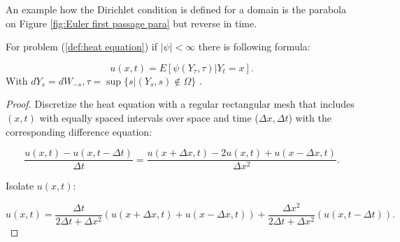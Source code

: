 \documentclass[a4paper,12pt]{article}
\begin{document}
An example how the Dirichlet condition is defined for a domain
is the parabola on Figure \ref{fig:Euler first passage para} but
reverse in time.

\begin{lemma} \label{lem:BM HE}
    For problem (\ref{def:heat equation}) if $ |\psi|< \infty$
    there is following formula:

    \begin{equation}
        u(x,t)=E[\psi(Y_{\tau},\tau) | Y_{t} =x].
    \end{equation}
    With $dY_{s} = dW_{-s},\tau = \sup\{s | (Y_{s},s) \notin \Omega\}$ .
\end{lemma}


\begin{proof}
    Discretize the heat equation
    with a regular rectangular mesh that includes $(x,t)$ with equally
    spaced intervals over space and time ($\Delta x, \Delta t$) with
    the corresponding difference equation:

    \begin{equation}
        \frac{u(x,t)-u(x,t-\Delta t)}{\Delta t} = \frac{u(x + \Delta x,t)-2 u(x,t) +u(x - \Delta x,t)}{\Delta x^{2}} .
    \end{equation}

    Isolate $u(x,t)$:

    \begin{equation} \label{eq:discrete iso heat equation}
        u(x,t) =
        \frac{\Delta t}{ 2 \Delta t + \Delta x^{2}}
        \left(
        u(x+\Delta x,t)+u(x-\Delta x,t)
        \right) +
        \frac{\Delta x^{2}}{ 2 \Delta t + \Delta x^{2}}
        \left(
        u(x,t-\Delta t)
        \right).
    \end{equation}


\end{proof}
\end{document}
